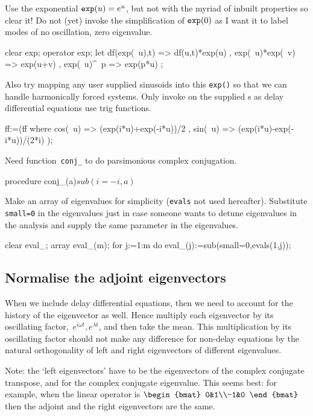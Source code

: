 \documentclass[11pt,a5paper]{article}
\begin{document}
Use the exponential $\verb|exp|(u)=e^{u}$, but not with the
myriad of inbuilt properties so clear it! Do not (yet)
invoke the simplification of $\verb|exp|(0)$ as I want it to
label modes of no oscillation, zero eigenvalue.
\begin{reduce}
clear exp; operator exp;
let { df(exp(~u),t) => df(u,t)*exp(u)
    , exp(~u)*exp(~v) => exp(u+v)
    , exp(~u)^~p => exp(p*u)
    };
\end{reduce}
Also try mapping any user supplied sinusoids into 
this \verb|exp()| so that we can handle harmonically 
forced systems.  Only invoke on the supplied \ode{}s as 
delay differential equations use trig functions.
\begin{reduce}
ff:=(ff where { cos(~u) => (exp(i*u)+exp(-i*u))/2
              , sin(~u) => (exp(i*u)-exp(-i*u))/(2*i) 
              } );
\end{reduce}


Need function~\verb|conj_| to do parsimonious complex
conjugation.   
\begin{reduce}
procedure conj_(a)$ sub(i=-i,a)$
\end{reduce}

Make an array of eigenvalues for simplicity (\verb|evals|
not used hereafter).  Substitute \verb|small=0| in the
eigenvalues just in case someone wants to detune eigenvalues
in the analysis and supply the same parameter in the
eigenvalues.
\begin{reduce}
clear eval_;  array eval_(m);
for j:=1:m do eval_(j):=sub(small=0,evals(1,j));
\end{reduce}



\subsection{Normalise the adjoint eigenvectors}
When we include delay differential equations, then we need
to account for the history of the eigenvector as well. Hence
multiply each eigenvector by its oscillating
factor,~\(e^{i\omega t}, e^{\lambda t}\), and then take the
mean. This multiplication by its oscillating factor should
not make any difference for non-delay equations by the
natural orthogonality of left and right eigenvectors of
different eigenvalues. 

Note: the `left eigenvectors' have to be the eigenvectors of
the complex conjugate transpose, and for the complex
conjugate eigenvalue. This seems best: for example, when the
linear operator is \(\begin{bmat} 0&1\\-1&0 \end{bmat}\)
then the adjoint and the right eigenvectors are the same.
\end{document}
